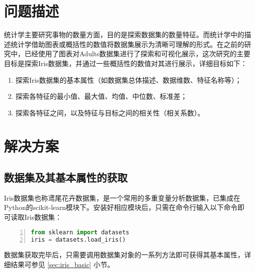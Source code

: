 \documentclass[12pt,a4paper]{article}
\theoremstyle{definition}
\begin{document}
\noindent
\noindent{}
\vspace{-1.5\baselineskip}

\section{问题描述}

统计学主要研究事物的数量方面，目的是探索数据集的数量特征。而统计学中的描述统计学借助图表或概括性的数值将数据集展示为清晰可理解的形式。在之前的研究中，已经使用了图表对Adults数据集进行了探索和可视化展示，这次研究的主要目标是探索Iris数据集，并通过一些概括性的数值对其进行展示，详细目标如下：

\begin{enumerate}
	\item 探索Iris数据集的基本属性（如数据集总体描述、数据维数、特征名称等）；
	
	\item 探索各特征的最小值、最大值、均值、中位数、标准差；
	
	\item 探索各特征之间，以及特征与目标之间的相关性（相关系数）。
\end{enumerate}

\section{解决方案}

\subsection{数据集及其基本属性的获取}

Iris数据集也称鸢尾花卉数据集，是一个常用的多重变量分析数据集，已集成在Python的scikit-learn模块下。安装好相应模块后，只需在命令行输入以下命令即可读取Iris数据集：

\begin{lstlisting}[language=Python,
numbers=left,
keywordstyle=\color{blue!70},
frame=shadowbox,
breaklines=True]
from sklearn import datasets
iris = datasets.load_iris()
\end{lstlisting}

数据集获取完毕后，只需要调用数据集对象的一系列方法即可获得其基本属性，详细结果可参见 \ref{sec:iris_basic} 小节。
\end{document}
